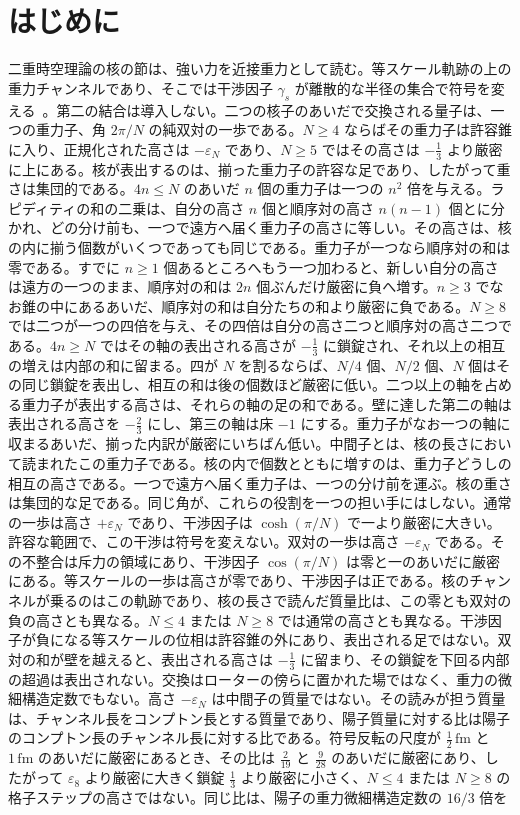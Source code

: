 \documentclass[a4paper]{article}
\begin{document}
\section{はじめに}
\label{sec:intro}

二重時空理論の核の節は、強い力を近接重力として読む。等スケール軌跡の上の重力チャンネルであり、そこでは干渉因子 \(\gamma_s\) が離散的な半径の集合で符号を変える~\cite{dst-main}。第二の結合は導入しない。二つの核子のあいだで交換される量子は、一つの重力子、角 \(2\pi/N\) の純双対の一歩である。\(N\ge 4\) ならばその重力子は許容錐に入り、正規化された高さは \(-\varepsilon_N\) であり、\(N\ge 5\) ではその高さは \(-\frac13\) より厳密に上にある。核が表出するのは、揃った重力子の許容な足であり、したがって重さは集団的である。\(4n\le N\) のあいだ \(n\) 個の重力子は一つの \(n^2\) 倍を与える。ラピディティの和の二乗は、自分の高さ \(n\) 個と順序対の高さ \(n(n-1)\) 個とに分かれ、どの分け前も、一つで遠方へ届く重力子の高さに等しい。その高さは、核の内に揃う個数がいくつであっても同じである。重力子が一つなら順序対の和は零である。すでに \(n\ge 1\) 個あるところへもう一つ加わると、新しい自分の高さは遠方の一つのまま、順序対の和は \(2n\) 個ぶんだけ厳密に負へ増す。\(n\ge 3\) でなお錐の中にあるあいだ、順序対の和は自分たちの和より厳密に負である。\(N\ge 8\) では二つが一つの四倍を与え、その四倍は自分の高さ二つと順序対の高さ二つである。\(4n\ge N\) ではその軸の表出される高さが \(-\frac13\) に鎖錠され、それ以上の相互の増えは内部の和に留まる。四が \(N\) を割るならば、\(N/4\) 個、\(N/2\) 個、\(N\) 個はその同じ鎖錠を表出し、相互の和は後の個数ほど厳密に低い。二つ以上の軸を占める重力子が表出する高さは、それらの軸の足の和である。壁に達した第二の軸は表出される高さを \(-\frac23\) にし、第三の軸は床 \(-1\) にする。重力子がなお一つの軸に収まるあいだ、揃った内訳が厳密にいちばん低い。中間子とは、核の長さにおいて読まれたこの重力子である。核の内で個数とともに増すのは、重力子どうしの相互の高さである。一つで遠方へ届く重力子は、一つの分け前を運ぶ。核の重さは集団的な足である。同じ角が、これらの役割を一つの担い手にはしない。通常の一歩は高さ \(+\varepsilon_N\) であり、干渉因子は \(\cosh(\pi/N)\) で一より厳密に大きい。許容な範囲で、この干渉は符号を変えない。双対の一歩は高さ \(-\varepsilon_N\) である。その不整合は斥力の領域にあり、干渉因子 \(\cos(\pi/N)\) は零と一のあいだに厳密にある。等スケールの一歩は高さが零であり、干渉因子は正である。核のチャンネルが乗るのはこの軌跡であり、核の長さで読んだ質量比は、この零とも双対の負の高さとも異なる。\(N\le 4\) または \(N\ge 8\) では通常の高さとも異なる。干渉因子が負になる等スケールの位相は許容錐の外にあり、表出される足ではない。双対の和が壁を越えると、表出される高さは \(-\frac13\) に留まり、その鎖錠を下回る内部の超過は表出されない。交換はローターの傍らに置かれた場ではなく、重力の微細構造定数でもない。高さ \(-\varepsilon_N\) は中間子の質量ではない。その読みが担う質量は、チャンネル長をコンプトン長とする質量であり、陽子質量に対する比は陽子のコンプトン長のチャンネル長に対する比である。符号反転の尺度が \(\tfrac12\,\mathrm{fm}\) と \(1\,\mathrm{fm}\) のあいだに厳密にあるとき、その比は \(\tfrac{2}{19}\) と \(\tfrac{9}{28}\) のあいだに厳密にあり、したがって \(\varepsilon_8\) より厳密に大きく鎖錠 \(\tfrac13\) より厳密に小さく、\(N\le 4\) または \(N\ge 8\) の格子ステップの高さではない。同じ比は、陽子の重力微細構造定数の \(16/3\) 倍を 
\end{document}
